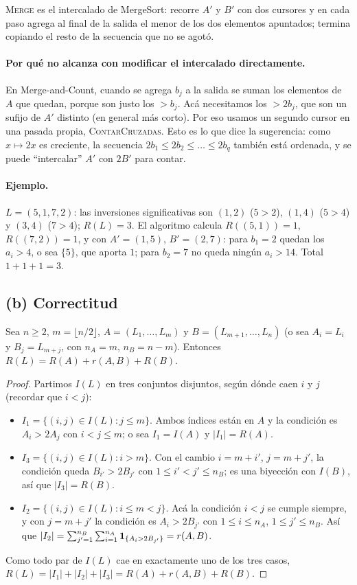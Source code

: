 \textsc{Merge} es el intercalado de MergeSort: recorre $A'$ y $B'$ con dos cursores y en
cada paso agrega al final de la salida el menor de los dos elementos apuntados; termina
copiando el resto de la secuencia que no se agotó.

\paragraph{Por qué no alcanza con modificar el intercalado directamente.} En
Merge-and-Count, cuando se agrega $b_j$ a la salida se suman los elementos de $A$ que
quedan, porque son justo los $>b_j$. Acá necesitamos los $>2b_j$, que son un sufijo de $A'$
distinto (en general más corto). Por eso usamos un segundo cursor en una pasada propia,
\textsc{ContarCruzadas}. Esto es lo que dice la sugerencia: como $x\mapsto 2x$ es
creciente, la secuencia $2b_1\le 2b_2\le\dots\le 2b_q$ también está ordenada, y se puede
``intercalar'' $A'$ con $2B'$ para contar.

\paragraph{Ejemplo.} $L=(5,1,7,2)$: las inversiones significativas son $(1,2)$
($5>2$), $(1,4)$ ($5>4$) y $(3,4)$ ($7>4$); $R(L)=3$. El algoritmo calcula
$R((5,1))=1$, $R((7,2))=1$, y con $A'=(1,5)$, $B'=(2,7)$: para $b_1=2$ quedan los $a_i>4$,
o sea $\{5\}$, que aporta $1$; para $b_2=7$ no queda ningún $a_i>14$. Total
$1+1+1=3$.

\subsection*{(b) Correctitud}

\begin{lema}[Descomposición (2.1)--(2.2)]\label{l:desc}
Sea $n\ge 2$, $m=\lfloor n/2\rfloor$, $A=(L_1,\dots,L_m)$ y $B=(L_{m+1},\dots,L_n)$ (o
sea $A_i=L_i$ y $B_j=L_{m+j}$, con $n_A=m$, $n_B=n-m$). Entonces
$R(L)=R(A)+r(A,B)+R(B)$.
\end{lema}
\begin{proof}
Partimos $I(L)$ en tres conjuntos disjuntos, según dónde caen $i$ y $j$ (recordar que
$i<j$):
\begin{itemize}
\item $I_1=\{(i,j)\in I(L): j\le m\}$. Ambos índices están en $A$ y la condición es
$A_i>2A_j$ con $i<j\le m$; o sea $I_1=I(A)$ y $|I_1|=R(A)$.
\item $I_3=\{(i,j)\in I(L): i> m\}$. Con el cambio $i=m+i'$, $j=m+j'$, la condición queda
$B_{i'}>2B_{j'}$ con $1\le i'<j'\le n_B$; es una biyección con $I(B)$, así que
$|I_3|=R(B)$.
\item $I_2=\{(i,j)\in I(L): i\le m<j\}$. Acá la condición $i<j$ se cumple siempre, y con
$j=m+j'$ la condición es $A_i>2B_{j'}$ con $1\le i\le n_A$, $1\le j'\le n_B$. Así que
$|I_2|=\sum_{j'=1}^{n_B}\sum_{i=1}^{n_A}\mathbf{1}_{\{A_i>2B_{j'}\}}=r(A,B)$.
\end{itemize}
Como todo par de $I(L)$ cae en exactamente uno de los tres casos,
$R(L)=|I_1|+|I_2|+|I_3|=R(A)+r(A,B)+R(B)$.
\end{proof}

